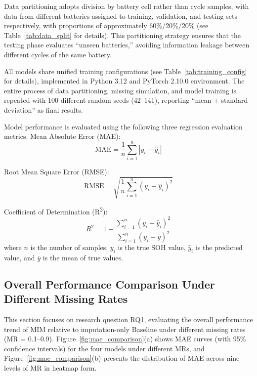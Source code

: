 \documentclass[10pt,a4paper]{article}
\begin{document}
Data partitioning adopts division by battery cell rather than cycle samples, with data from different batteries assigned to training, validation, and testing sets respectively, with proportions of approximately 60\%/20\%/20\% (see Table~\ref{tab:data_split} for details). This partitioning strategy ensures that the testing phase evaluates ``unseen batteries,'' avoiding information leakage between different cycles of the same battery.

All models share unified training configurations (see Table~\ref{tab:training_config} for details), implemented in Python 3.12 and PyTorch 2.10.0 environment. The entire process of data partitioning, missing simulation, and model training is repeated with 100 different random seeds (42--141), reporting ``mean $\pm$ standard deviation'' as final results.

Model performance is evaluated using the following three regression evaluation metrics. Mean Absolute Error (MAE):
\begin{equation}
    \text{MAE} = \frac{1}{n} \sum_{i=1}^{n} |y_i - \hat{y}_i|
    \label{eq:mae}
\end{equation}

Root Mean Square Error (RMSE):
\begin{equation}
    \text{RMSE} = \sqrt{\frac{1}{n} \sum_{i=1}^{n} (y_i - \hat{y}_i)^2}
    \label{eq:rmse}
\end{equation}

Coefficient of Determination (R\textsuperscript{2}):
\begin{equation}
    R^2 = 1 - \frac{\sum_{i=1}^{n} (y_i - \hat{y}_i)^2}{\sum_{i=1}^{n} (y_i - \bar{y})^2}
    \label{eq:r2}
\end{equation}
where $n$ is the number of samples, $y_i$ is the true SOH value, $\hat{y}_i$ is the predicted value, and $\bar{y}$ is the mean of true values.

\subsection{Overall Performance Comparison Under Different Missing Rates}

This section focuses on research question RQ1, evaluating the overall performance trend of MIM relative to imputation-only Baseline under different missing rates (MR = 0.1--0.9). Figure~\ref{fig:mae_comparison}(a) shows MAE curves (with 95\% confidence intervals) for the four models under different MRs, and Figure~\ref{fig:mae_comparison}(b) presents the distribution of MAE across nine levels of MR in heatmap form.
\end{document}
